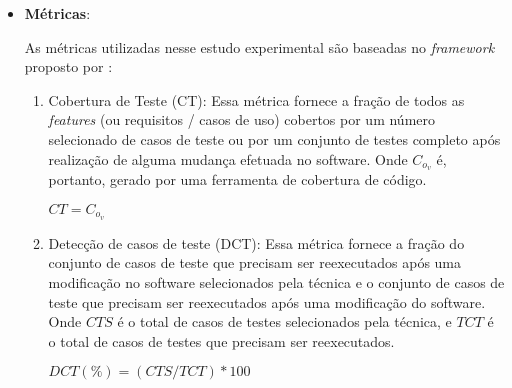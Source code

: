 \begin{itemize}
\begin{enumerate}[label=\bf QP\arabic*,leftmargin=2.1cm]
    \end{enumerate}
    

    
    \item \textbf{Métricas}:
    
    As métricas utilizadas nesse estudo experimental são baseadas no \textit{framework} proposto por :
    
    
    \begin{enumerate}[label=\bf M\arabic*,leftmargin=2.1cm]
       
        \item Cobertura de Teste (CT): Essa métrica fornece a fração de todos as \textit{features} (ou requisitos / casos de uso) cobertos por um número selecionado de casos de teste ou por um conjunto de testes completo após realização de alguma mudança efetuada no software. Onde \textbf{$C_o_v$} é, portanto, gerado por uma ferramenta de cobertura de código.
        
        \begin{center}
        \noindent\fbox
        { 
            \parbox{.8\textwidth}
            {
                \begin{center}
            
                \textbf{$CT = C_o_v$}
    
                \end{center}
            }
        }
        \end{center}
        
        \item Detecção de casos de teste (DCT): Essa métrica fornece a fração do conjunto de casos de teste que precisam ser reexecutados após uma modificação no software selecionados pela técnica e o conjunto de casos de teste que precisam ser reexecutados após uma modificação do software. Onde \textbf{$CTS$} é o total de casos de testes selecionados pela técnica, e \textbf{$TCT$} é o total de casos de testes que precisam ser reexecutados.  
        
        \begin{center}
        \noindent\fbox
        { 
            \parbox{.8\textwidth}
            {
                \begin{center}
            
                \textbf{$DCT (\%) = ({CTS}/{TCT})*100$}
    
                \end{center}
            }
        }
        \end{center}
        


\end{enumerate}
\end{itemize}
